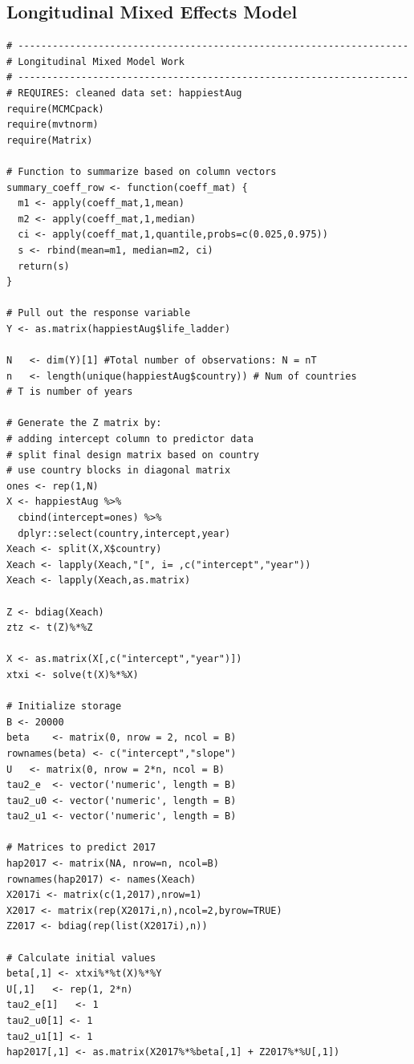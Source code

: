 \documentclass{article}
\begin{document}
\subsection{Longitudinal Mixed Effects Model} \label{sec:adx_long_R}
\begin{verbatim}
# --------------------------------------------------------------------
# Longitudinal Mixed Model Work
# --------------------------------------------------------------------
# REQUIRES: cleaned data set: happiestAug
require(MCMCpack)
require(mvtnorm)
require(Matrix)

# Function to summarize based on column vectors
summary_coeff_row <- function(coeff_mat) {
  m1 <- apply(coeff_mat,1,mean)
  m2 <- apply(coeff_mat,1,median)
  ci <- apply(coeff_mat,1,quantile,probs=c(0.025,0.975))
  s <- rbind(mean=m1, median=m2, ci)
  return(s)
}

# Pull out the response variable
Y <- as.matrix(happiestAug$life_ladder)

N	<- dim(Y)[1] #Total number of observations: N = nT
n	<- length(unique(happiestAug$country)) # Num of countries
# T is number of years

# Generate the Z matrix by:
# adding intercept column to predictor data
# split final design matrix based on country
# use country blocks in diagonal matrix
ones <- rep(1,N)
X <- happiestAug %>%
  cbind(intercept=ones) %>%
  dplyr::select(country,intercept,year)
Xeach <- split(X,X$country)
Xeach <- lapply(Xeach,"[", i= ,c("intercept","year"))
Xeach <- lapply(Xeach,as.matrix)

Z <- bdiag(Xeach)
ztz	<- t(Z)%*%Z

X <- as.matrix(X[,c("intercept","year")])
xtxi <- solve(t(X)%*%X)

# Initialize storage
B <- 20000
beta	<- matrix(0, nrow = 2, ncol = B)
rownames(beta) <- c("intercept","slope")
U	<- matrix(0, nrow = 2*n, ncol = B)
tau2_e	<- vector('numeric', length = B)
tau2_u0	<- vector('numeric', length = B)
tau2_u1	<- vector('numeric', length = B)

# Matrices to predict 2017
hap2017 <- matrix(NA, nrow=n, ncol=B)
rownames(hap2017) <- names(Xeach)
X2017i <- matrix(c(1,2017),nrow=1)
X2017 <- matrix(rep(X2017i,n),ncol=2,byrow=TRUE)
Z2017 <- bdiag(rep(list(X2017i),n))

# Calculate initial values
beta[,1] <- xtxi%*%t(X)%*%Y
U[,1]	<- rep(1, 2*n)
tau2_e[1]	<- 1
tau2_u0[1] <- 1
tau2_u1[1] <- 1
hap2017[,1] <- as.matrix(X2017%*%beta[,1] + Z2017%*%U[,1])


\end{verbatim}
\end{document}
